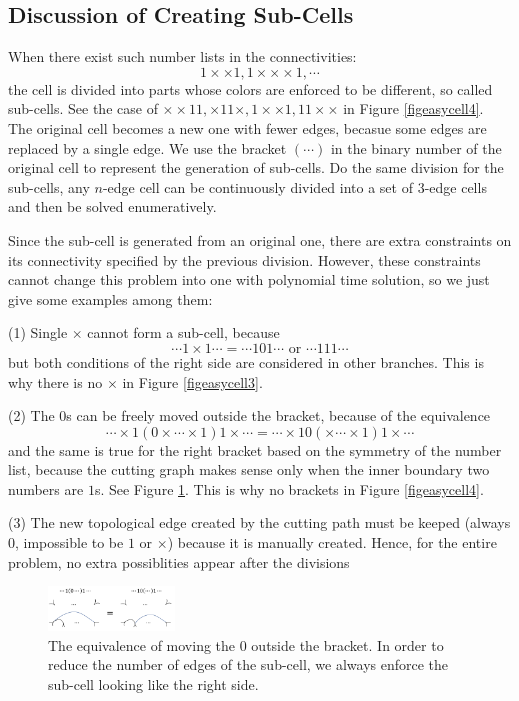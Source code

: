 \documentclass[journal]{IEEEtran}
\begin{document}
\subsection{Discussion of Creating Sub-Cells}\label{subsectiondiscussion}
When there exist such number lists in the connectivities: 
$$1\times\times1, 1\times\times\times1, \cdots$$
the cell is divided into parts whose colors are enforced to be different, so called sub-cells.
See the case of $\times\times11, \times11\times, 1\times\times1, 11\times\times$ in Figure \ref{figeasycell4}. The original cell becomes a new one with fewer edges, becasue some edges are replaced by a single edge. We use the bracket $(\cdots)$ in the binary number of the original cell to represent the generation of sub-cells.
Do the same division for the sub-cells, any $n$-edge cell can be continuously divided into a set of 3-edge cells and then be solved enumeratively. 

Since the sub-cell is generated from an original one, there are extra constraints on its connectivity specified by the previous division. However, these constraints cannot change this problem into one with polynomial time solution, so we just give some examples among them:

(1) Single $\times$ cannot form a sub-cell, because 
$$\cdots 1\times 1\cdots = \cdots 101\cdots \mbox{ or }\cdots 111\cdots$$
but both conditions of the right side are considered in other branches. This is why there is no $\times$ in Figure \ref{figeasycell3}.  

(2) The $0$s can be freely moved outside the bracket, because of the equivalence 
$$\cdots\times1(0\times\cdots\times1)1\times\cdots = \cdots\times10(\times\cdots\times1)1\times\cdots$$
and the same is true for the right bracket based on the symmetry of the number list, because the cutting graph makes sense only when the inner boundary two numbers are $1$s. See Figure \ref{figconstraint}. This is why no brackets in Figure \ref{figeasycell4}.

(3) The new topological edge created by the cutting path must be keeped (always $0$, impossible to be $1$ or $\times$) because it is manually created. Hence, for the entire problem, no extra possiblities appear after the divisions 

\begin{figure}[t]
\centering
\includegraphics[width = 0.3\textwidth]{proof/equiv_zero}
\caption{The equivalence of moving the $0$ outside the bracket. In order to reduce the number of edges of the sub-cell, we always enforce the sub-cell looking like the right side. }\label{figconstraint}
\end{figure} 
\end{document}
